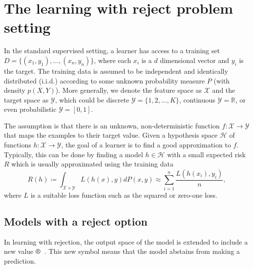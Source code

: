 \section{The learning with reject problem setting}\label{sec:preliminaries}

In the standard supervised setting, a learner has access to a training set $D = \{(x_1,y_1),\ldots, (x_n,y_n)\}$, where each $x_i$ is a $d$ dimensional vector and $y_i$ is the target. The training data is assumed to be independent and identically distributed (i.i.d.) according to some unknown probability measure $P$ (with density $p(X,Y)$).
More generally, we denote the feature space as $\mathcal{X}$ and the target space as $\mathcal{Y}$, which could be discrete $\mathcal{Y} = \{1, 2, \ldots, K\}$, continuous  $\mathcal{Y} = \mathbb{R}$, or even probabilistic $\mathcal{Y} = [0,1]$. 

The assumption is that there is an unknown, non-deterministic function $f\colon \mathcal{X} \to \mathcal{Y}$ that maps the examples to their target value. Given a hypothesis space $\mathcal{H}$ of functions $h \colon \mathcal{X} \to \mathcal{Y}$, the goal of a learner is to find a good approximation to $f$. Typically, this can be done by finding a model $h \in \mathcal{H}$ with a small expected risk $R$ which is usually approximated using the training data
\begin{equation}
    R(h) \coloneqq \int_{\mathcal{X} \times \mathcal{Y}} L(h(x),y) d P(x,y) \approx \sum_{i=1}^{n} \frac{L(h(x_i),y_i)}{n},
\end{equation}
where $L$ is a suitable loss function such as the squared or zero-one loss.



\subsection{Models with a reject option}
In learning with rejection, the output space of the model is extended to include a new value $\rr{}$~\citep{Cortes2016,pmlr-v80-cortes18a,Sousa2014a}. This new symbol means that the model abstains from making a prediction. 

